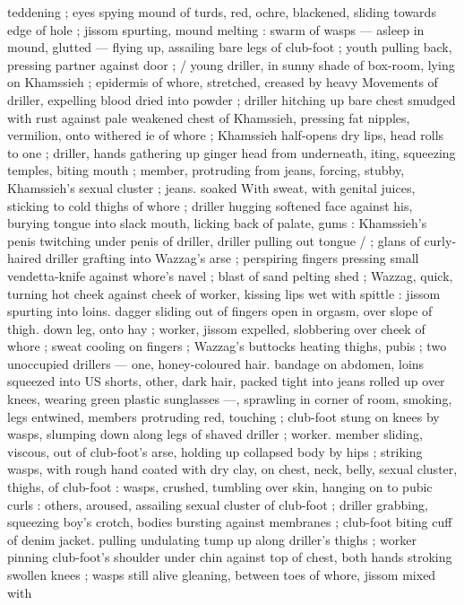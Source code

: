 teddening ; eyes spying mound of turds, red, ochre, blackened,
sliding towards edge of hole ; jissom spurting, mound melting :
swarm of wasps --- asleep in mound, glutted --- flying up, assailing
bare legs of club-foot ; youth pulling back, pressing partner against
door ; / young driller, in sunny shade of box-room, lying on
Khamssieh ; epidermis of whore, stretched, creased by heavy
Movements of driller, expelling blood dried into powder ; driller
hitching up bare chest smudged with rust against pale weakened
chest of Khamssieh, pressing fat nipples, vermilion, onto withered
ie of whore ; Khamssieh half-opens dry lips, head rolls to one
; driller, hands gathering up ginger head from underneath,
iting, squeezing temples, biting mouth ; member, protruding from
jeans, forcing, stubby, Khamssieh’s sexual cluster ; jeans. soaked
With sweat, with genital juices, sticking to cold thighs of whore ;
driller hugging softened face against his, burying tongue into slack
mouth, licking back of palate, gums : Khamssieh’s penis twitching
under penis of driller, driller pulling out tongue / ; glans of curly-
haired driller grafting into Wazzag's arse ; perspiring fingers
pressing small vendetta-knife against whore's navel ; blast of sand
pelting shed ; Wazzag, quick, turning hot cheek against cheek of
worker, kissing lips wet with spittle : jissom spurting into loins.
dagger sliding out of fingers open in orgasm, over slope of thigh.
down leg, onto hay ; worker, jissom expelled, slobbering over cheek
of whore ; sweat cooling on fingers ; Wazzag's buttocks heating
thighs, pubis ; two unoccupied drillers --- one, honey-coloured hair.
bandage on abdomen, loins squeezed into US shorts, other, dark
hair, packed tight into jeans rolled up over knees, wearing green
plastic sunglasses ---, sprawling in corner of room, smoking, legs
entwined, members protruding red, touching ; club-foot stung on
knees by wasps, slumping down along legs of shaved driller ; worker.
member sliding, viscous, out of club-foot's arse, holding up
collapsed body by hips ; striking wasps, with rough hand coated with
dry clay, on chest, neck, belly, sexual cluster, thighs, of club-foot :
wasps, crushed, tumbling over skin, hanging on to pubic curls :
others, aroused, assailing sexual cluster of club-foot ; driller
grabbing, squeezing boy's crotch, bodies bursting against
membranes ; club-foot biting cuff of denim jacket. pulling undulating
tump up along driller's thighs ; worker pinning club-foot's shoulder
under chin against top of chest, both hands stroking swollen knees
; wasps still alive gleaning, between toes of whore, jissom mixed with
